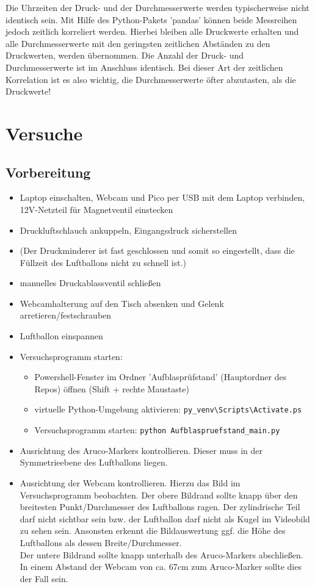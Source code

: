 \documentclass[german, 11pt]{scrartcl}
\begin{document}
Die Uhrzeiten der Druck- und der Durchmesserwerte werden typischerweise nicht identisch sein.
Mit Hilfe des Python-Pakets 'pandas' können beide Messreihen jedoch zeitlich korreliert werden.
Hierbei bleiben alle Druckwerte erhalten und alle Durchmesserwerte mit den geringsten zeitlichen Abständen
zu den Druckwerten, werden übernommen. Die Anzahl der Druck- und Durchmesserwerte ist im Anschluss identisch.
Bei dieser Art der zeitlichen Korrelation ist es also wichtig, die Durchmesserwerte öfter abzutasten, als die Druckwerte!

\section{Versuche}
\subsection{Vorbereitung}
\begin{itemize}
    \item Laptop einschalten, Webcam und Pico per USB mit dem Laptop verbinden, 12V-Netzteil für Magnetventil einstecken
    \item Druckluftschlauch ankuppeln, Eingangsdruck sicherstellen
    \item (Der Druckminderer ist fast geschlossen und somit so eingestellt, dass die Füllzeit des Luftballons nicht zu schnell ist.)
    \item manuelles Druckablassventil schließen
    \item Webcamhalterung auf den Tisch absenken und Gelenk arretieren/festschrauben
    \item Luftballon einspannen
    \item Versuchsprogramm starten:
    \begin{itemize}
        \item Powershell-Fenster im Ordner 'Aufblasprüfstand' (Hauptordner des Repos) öffnen (Shift + rechte Maustaste)
        \item virtuelle Python-Umgebung aktivieren: \texttt{py\_venv\textbackslash Scripts\textbackslash Activate.ps}
        \item Versuchsprogramm starten: \texttt{python Aufblaspruefstand\_main.py}
    \end{itemize}
    \item Ausrichtung des Aruco-Markers kontrollieren. Dieser muss in der Symmetrieebene des Luftballons liegen.
    \item Ausrichtung der Webcam kontrollieren. Hierzu das Bild im Versuchsprogramm beobachten.
    Der obere Bildrand sollte knapp über den breitesten Punkt/Durchmesser des Luftballons ragen.
    Der zylindrische Teil darf nicht sichtbar sein bzw. der Luftballon darf nicht als Kugel im Videobild zu sehen sein.
    Ansonsten erkennt die Bildauswertung ggf. die Höhe des Luftballons als dessen Breite/Durchmesser.\\
    Der untere Bildrand sollte knapp unterhalb des Aruco-Markers abschließen.
    In einem Abstand der Webcam von ca. 67cm zum Aruco-Marker sollte dies der Fall sein.
\end{itemize}
\end{document}
